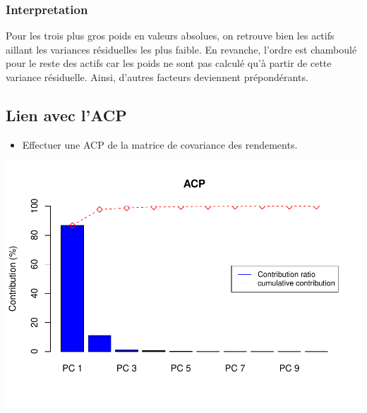 \documentclass[
]{article}
\providecommand{\tightlist}{%
  \setlength{\itemsep}{0pt}\setlength{\parskip}{0pt}}
\begin{document}
\hypertarget{interpretation}{%
\subsubsection{Interpretation}\label{interpretation}}

Pour les trois plus gros poids en valeurs absolues, on retrouve bien les
actifs aillant les variances résiduelles les plus faible. En revanche,
l'ordre est chamboulé pour le reste des actifs car les poids ne sont pas
calculé qu'à partir de cette variance résiduelle. Ainsi, d'autres
facteurs deviennent prépondérants.

\hypertarget{lien-avec-lacp}{%
\subsection{Lien avec l'ACP}\label{lien-avec-lacp}}

\begin{itemize}
\tightlist
\item
  Effectuer une ACP de la matrice de covariance des rendements.
\end{itemize}

\includegraphics{TP-4-E_files/figure-latex/unnamed-chunk-6-1}
\end{document}
